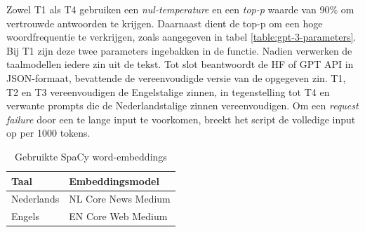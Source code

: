 Zowel T1 als T4 gebruiken een \textit{nul-temperature} en een \textit{top-p} waarde van 90\% om vertrouwde antwoorden te krijgen. Daarnaast dient de top-p om een hoge woordfrequentie te verkrijgen, zoals aangegeven in tabel \ref{table:gpt-3-parameters}. Bij T1 zijn deze twee parameters ingebakken in de functie. Nadien verwerken de taalmodellen iedere zin uit de tekst. Tot slot beantwoordt de HF of GPT API in JSON-formaat, bevattende de vereenvoudigde versie van de opgegeven zin. T1, T2 en T3 vereenvoudigen de Engelstalige zinnen, in tegenstelling tot T4 en verwante prompts die de Nederlandstalige zinnen vereenvoudigen. Om een \textit{request failure} door een te lange input te voorkomen, breekt het script de volledige input op per 1000 tokens.

\begin{center}
	\begin{table}[H]
		\begin{tabular}{ | m{7cm} | m{7cm} | } 
			\hline
			\textbf{Taal} & \textbf{Embeddingsmodel} \\
			\hline
			Nederlands & NL Core News Medium \\ 
			\hline
			Engels & EN Core Web Medium \\
			\hline
		\end{tabular}
		\caption{Gebruikte SpaCy word-embeddings}
		\label{table:wordembeddings-spacy}
	\end{table}
\end{center}

